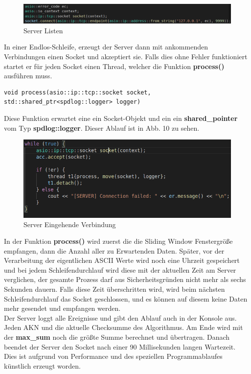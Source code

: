 \documentclass{article}
\begin{document}
\begin{center}
\begin{figure}[h]
    \centering
    \includegraphics[width=\textwidth]{clientep.png}
    \caption{Server Listen}
\end{figure}
\end{center}

In einer Endlos-Schleife, erzeugt der Server dann mit ankommenden Verbindungen einen Socket und akzeptiert sie. Falls dies ohne Fehler funktioniert startet er für jeden Socket einen Thread, welcher die Funktion \textbf{process()} ausführen muss.

\begin{lstlisting}
void process(asio::ip::tcp::socket socket,
std::shared_ptr<spdlog::logger> logger)
\end{lstlisting}

Diese Funktion erwartet eine ein Socket-Objekt und ein ein \textbf{shared\_pointer} vom Typ \textbf{spdlog::logger}. Dieser Ablauf ist in Abb. 10 zu sehen.

\begin{center}
\begin{figure}[h]
    \centering
    \includegraphics[width=\textwidth]{servercon.png}
    \caption{Server Eingehende Verbindung}
\end{figure}
\end{center}

In der Funktion \textbf{process()} wird zuerst die die Sliding Window Fenstergröße empfangen, dann die Anzahl aller zu Erwartenden Daten. Später, vor der Verarbeitung der eigentlichen ASCII Werte wird noch eine Uhrzeit gespeichert und bei jedem Schleifendurchlauf wird diese mit der aktuellen Zeit am Server verglichen, der gesamte Prozess darf aus Sicherheitsgründen nicht mehr als sechs Sekunden dauern. Falls diese Zeit überschritten wird, wird beim nächsten Schleifendurchlauf das Socket geschlossen, und es können auf diesem keine Daten mehr gesendet und empfangen werden.\\
Der Server loggt alle Ereignisse und gibt den Ablauf auch in der Konsole aus. Jeden AKN und die aktuelle Checksumme des Algorithmus. Am Ende wird mit der \textbf{max\_sum} noch die größte Summe berechnet und übertragen. Danach beendet der Server den Socket nach einer 90 Millisekunden langen Wartezeit. Dies ist aufgrund von Performance und des speziellen Programmablaufes künstlich erzeugt worden.
\end{document}
